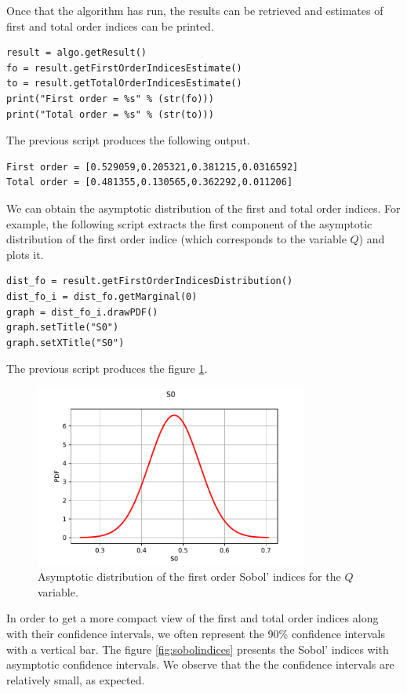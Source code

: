\documentclass{article}
\begin{document}
Once that the algorithm has run, the results can be retrieved and estimates 
of first and total order indices can be printed. 
\begin{lstlisting}
result = algo.getResult()
fo = result.getFirstOrderIndicesEstimate()
to = result.getTotalOrderIndicesEstimate()
print("First order = %s" % (str(fo)))
print("Total order = %s" % (str(to)))
\end{lstlisting}

The previous script produces the following output.
\begin{lstlisting}
First order = [0.529059,0.205321,0.381215,0.0316592]
Total order = [0.481355,0.130565,0.362292,0.011206]
\end{lstlisting}

We can obtain the asymptotic distribution of the first and total 
order indices. 
For example, the following script extracts the first component of the 
asymptotic distribution of the first order indice (which corresponds to the variable 
$Q$) and plots it.
\begin{lstlisting}
dist_fo = result.getFirstOrderIndicesDistribution()
dist_fo_i = dist_fo.getMarginal(0)
graph = dist_fo_i.drawPDF()
graph.setTitle("S0")
graph.setXTitle("S0")
\end{lstlisting}
The previous script produces the figure \ref{fig:asymptQ}.

\begin{figure}[!ht]
\begin{center}
    \includegraphics[width=9cm]{figures/S0-distribution} 
\end{center}
\caption{Asymptotic distribution of the first order Sobol' indices 
for the $Q$ variable.}
\label{fig:asymptQ}
\end{figure}

In order to get a more compact view of the first and total order indices 
along with their confidence intervals, we often represent the 90\% confidence 
intervals with a vertical bar. 
The figure \ref{fig:sobolindices} presents the Sobol' indices with 
asymptotic confidence intervals. 
We observe that the the confidence intervals are relatively small, 
as expected. 
\end{document}

